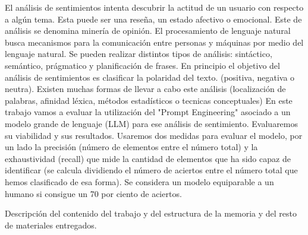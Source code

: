 
El análisis de sentimientos intenta descubrir la actitud de un usuario con respecto a algún tema.
Esta puede ser una reseña, un estado afectivo o emocional. Este de análisis se denomina minería de opinión.
El procesamiento de lenguaje natural busca mecanismos para la comunicación entre personas y máquinas por medio del
lenguaje natural. Se pueden realizar distintos tipos de análisis: sintáctico, semántico, prágmatico y planificación de frases.
En principio el objetivo del análisis de sentimientos es clasificar la polaridad del texto. (positiva, negativa o neutra).
Existen muchas formas de llevar a cabo este análisis (localización de palabras, afinidad léxica, métodos estadísticos o tecnicas conceptuales)
En este trabajo vamos a evaluar la utilización del "Prompt Engineering" asociado a un modelo grande de lenguaje (LLM) para ese análisis de sentimiento.
Evaluaremos su viabilidad y sus resultados. Usaremos dos medidas para evaluar el modelo, por un lado la precisión (número de elementos entre el número total) 
y la exhaustividad (recall) que mide la cantidad de elementos que ha sido capaz de identificar (se calcula dividiendo el número de aciertos entre el número 
total que hemos clasificado de esa forma). Se considera un modelo equiparable a un humano si consigue un 70 por ciento de aciertos.

Descripción del contenido del trabajo y del estructura de la memoria y del resto de materiales entregados.
